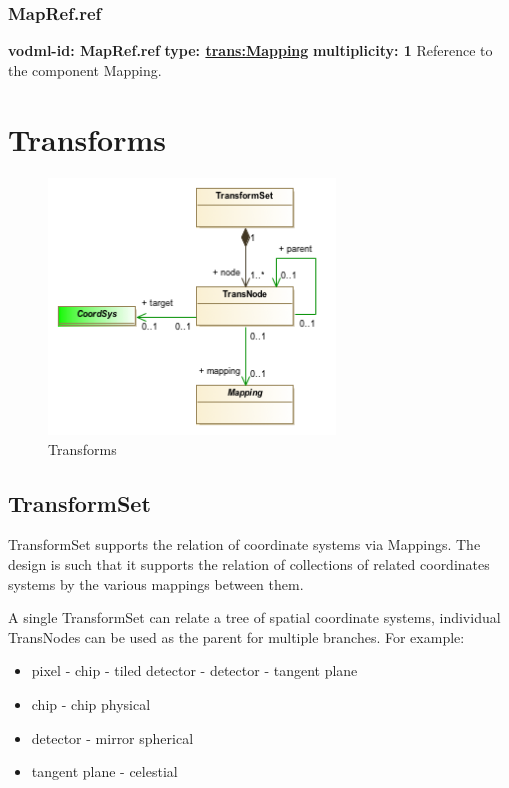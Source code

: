     \subsubsection{MapRef.ref}
      \textbf{vodml-id: MapRef.ref} \newline
      \textbf{type: \hyperref[sect:Mapping]{trans:Mapping}} \newline
      \textbf{multiplicity: 1} \newline 
      Reference to the component Mapping.


\pagebreak
\section{Transforms}

  \begin{figure}[h]
  \begin{center}
    \includegraphics[width=3.0in]{diagrams/transforms_top.png}
    \caption{Transforms}\label{fig:Transforms}
  \end{center}
  \end{figure}

  \subsection{TransformSet}
  \label{sect:TransformSet}
    TransformSet supports the relation of coordinate systems via Mappings. The design is such that it supports the relation of collections of related coordinates systems by the various mappings between them. 

    A single TransformSet can relate a tree of spatial coordinate systems, individual TransNodes can be used as the parent for multiple branches. For example:
    \begin{itemize}
    \item pixel - chip - tiled detector - detector - tangent plane 
    \item chip - chip physical 
    \item detector - mirror spherical 
    \item tangent plane - celestial 
    \end{itemize}

